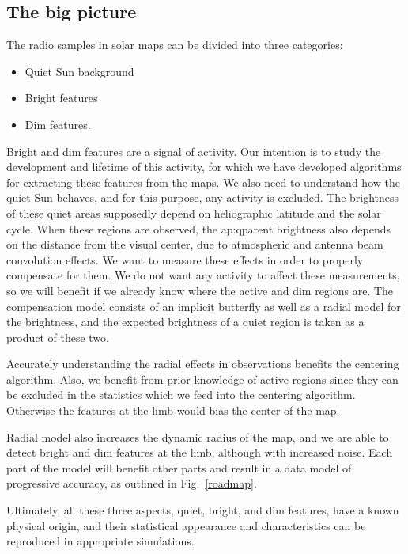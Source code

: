 \documentclass{aa}
\begin{document}
\subsection{The big picture}

The radio samples in solar maps can be divided into three categories: \begin{itemize} \item Quiet Sun background \item 
Bright features \item Dim features. \end{itemize} Bright and dim features are a signal of activity. Our intention is to 
study the development and lifetime of this activity, for which we have developed algorithms for extracting these 
features from the maps. We also need to understand how the quiet Sun behaves, and for this purpose, any activity is 
excluded. The brightness of these quiet areas supposedly depend on heliographic latitude and the solar cycle. When these 
regions are observed, the ap:qparent brightness also depends on the distance from the visual center, due to atmospheric 
and antenna beam convolution effects. We want to measure these effects in order to properly compensate for them. We do 
not want any activity to affect these measurements, so we will benefit if we already know where the active and dim 
regions are. The compensation model consists of an implicit butterfly as well as a radial model for the brightness, and 
the expected brightness of a quiet region is taken as a product of these two.

Accurately understanding the radial effects in observations benefits the centering algorithm. Also, we benefit from 
prior knowledge of active regions since they can be excluded in the statistics which we feed into the centering 
algorithm. Otherwise the features at the limb would bias the center of the map.

Radial model also increases the dynamic radius of the map, and we are able to detect bright and dim features at the 
limb, although with increased noise. Each part of the model will benefit other parts and result in a data model of progressive accuracy, as outlined in Fig.~\ref{roadmap}.

Ultimately, all these three aspects, quiet, bright, and dim features, have a known physical origin, and their 
statistical appearance and characteristics can be reproduced in appropriate simulations.
\end{document}

